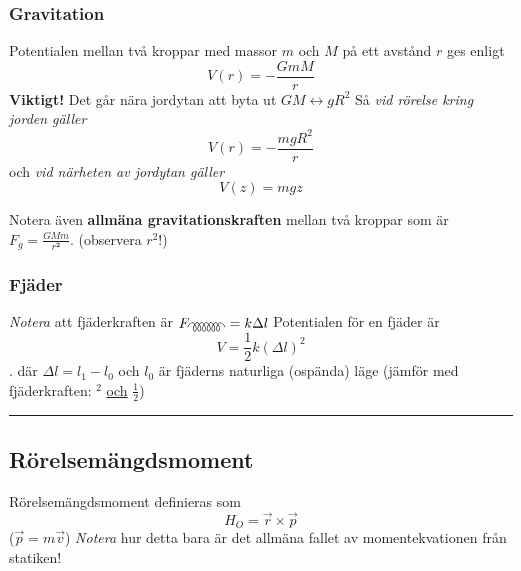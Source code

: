 \documentclass{article}
\newenvironment{ankiflashcard}[1]{}{}
\newcommand{\ruler}{
\rule{0.5\textwidth}{0.5pt}
}
\begin{document}
\begin{paracol}{2}
\begin{ankiflashcard}{Definiera gravitationspotentialen, i alla tre fall.}
\subsubsection{Gravitation}
Potentialen mellan två kroppar med massor $m$ och $M$ på ett avstånd $r$ ges enligt
$$
V(r)=-\frac{GmM}{r}
$$
\textbf{Viktigt!} Det går nära jordytan att byta ut $GM\longleftrightarrow gR^2$
Så \textit{vid rörelse kring jorden gäller}
$$
V(r)=-\frac{mgR^2}{r}
$$
och \textit{vid närheten av jordytan gäller}
$$
V(z)=mgz
$$
\end{ankiflashcard}

\begin{ankiflashcard}{Definera allmäna gravitationskraften.}
    Notera även \textbf{allmäna gravitationskraften } mellan två kroppar som är $F_g = \frac{GMm}{r^{\mathbf 2}}$. (observera $r^2$!)
\end{ankiflashcard}
\begin{ankiflashcard}{Definiera potentialenergi och fjäderkraft för en fjäder.}
    \subsubsection{Fjäder}
    \textit{Notera} att fjäderkraften är $F_{\gluon}=k\Delta l$
    Potentialen för en fjäder är
    $$
    V = \frac{1}{2}k(\Delta l)^2
    $$ .
    där $\Delta l=l_1-l_0$ och $l_0$ är fjäderns naturliga (ospända) läge (jämför med fjäderkraften: $^2$ \underline{och} $\frac 1 2$)
\end{ankiflashcard}
\ruler

\begin{ankiflashcard}{Definiera rörelsemängdsmoment}
    
\subsection{Rörelsemängdsmoment}
Rörelsemängdsmoment definieras som
$$
H_O = \vec r \times \vec p
$$
($\vec p = m \vec v$)
\textit{Notera} hur detta bara är det allmäna fallet av momentekvationen från statiken!
\end{ankiflashcard}



\end{paracol}
\end{document}
